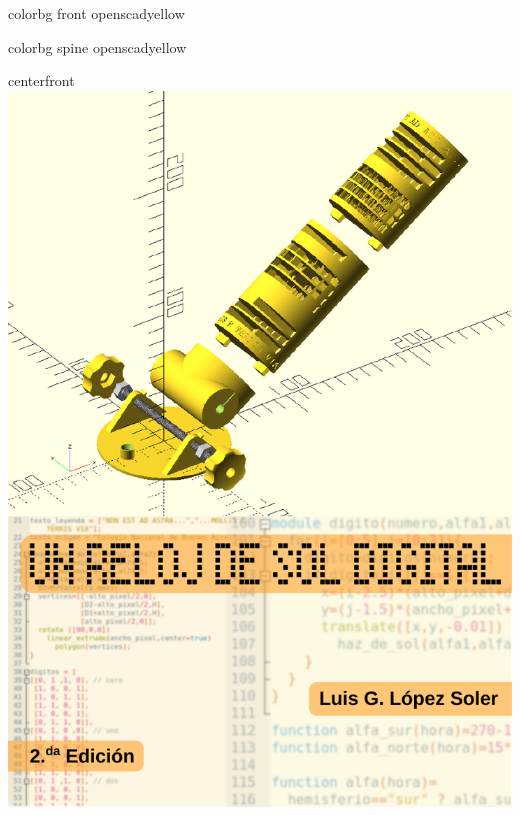 \documentclass[coverheight=210mm,coverwidth=148.5mm, bleedwidth=13mm,
spinewidth=13mm, foldingmargin, marklength=4mm, 11pt]{bookcover}
\begin{document}
\begin{bookcover}

   \begin{bookcoverelement}{color}{bg front}
     openscadyellow
   \end{bookcoverelement}
   \begin{bookcoverelement}{color}{bg spine}
     openscadyellow
   \end{bookcoverelement}


    \begin{bookcoverelement}{center}{front}
     \includegraphics{tapa-A5.pdf}
   \end{bookcoverelement}


\end{bookcover}
\end{document}
